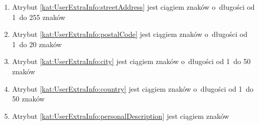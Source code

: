 \begin{itemize}[label={\textbf{Ograniczenia dla}}, wide, labelwidth=!, labelindent=0pt]
\begin{enumerate}[label={\textbf{OGR/\protect\threedigits{\arabic{enumi}}}}, wide, labelwidth=!, align=left, leftmargin=3cm, resume]
        \item Atrybut \ref{kat:UserExtraInfo:streetAddress} jest ciągiem znaków o~długości od 1~do 255 znaków
        \item Atrybut \ref{kat:UserExtraInfo:postalCode} jest ciągiem znaków o~długości od 1~do 20 znaków
        \item Atrybut \ref{kat:UserExtraInfo:city} jest ciągiem znaków o~długości od 1~do 50 znaków
        \item Atrybut \ref{kat:UserExtraInfo:country} jest ciągiem znaków o~długości od 1~do 50 znaków
        \item Atrybut \ref{kat:UserExtraInfo:personalDescription} jest ciągiem znaków
    \end{enumerate}

%
%

\end{itemize}

